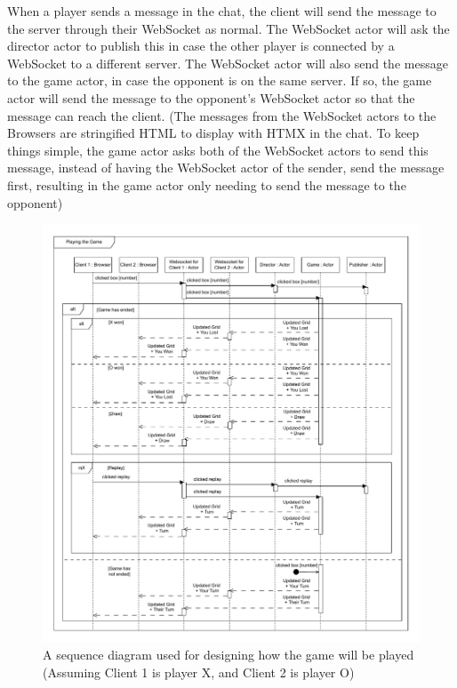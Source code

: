 \documentclass[]{final}
\begin{document}
When a player sends a message in the chat, the client will send the message to
the server through their WebSocket as normal. The WebSocket actor will ask the
director actor to publish this in case the other player is connected by a WebSocket
to a different server. The WebSocket actor will also send the message to the game
actor, in case the opponent is on the same server. If so, the game actor will
send the message to the opponent's WebSocket actor so that the message can reach
the client. (The messages from the WebSocket actors to the Browsers are
stringified HTML to display with HTMX in the chat. To keep things simple, the game
actor asks both of the WebSocket actors to send this message, instead of having
the WebSocket actor of the sender, send the message first, resulting in the game
actor only needing to send the message to the opponent)

\newpage

\begin{figure}[ht!]
  \centering
  \includegraphics[width=\linewidth]{sequence_playing}
  \caption{A sequence diagram used for designing how the game will be played (Assuming Client 1 is player X, and Client 2 is player O)}
  \label{fig: 11}
\end{figure}
\end{document}

